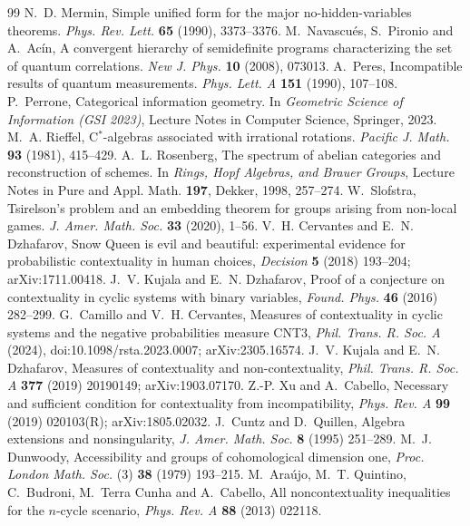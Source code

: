 \documentclass[11pt]{article}
\theoremstyle{definition}\newtheorem{definition}[theorem]{Definition}\newtheorem{remark}[theorem]{Remark}\newtheorem{example}[theorem]{Example}
\begin{document}
\begin{thebibliography}{99}
 N.~D. Mermin, Simple unified form for the major no-hidden-variables theorems. \emph{Phys. Rev. Lett.} \textbf{65} (1990),
  3373--3376.
 M.~Navascu\'es, S.~Pironio and A.~Ac\'in, A convergent hierarchy of semidefinite programs characterizing the set of quantum
  correlations. \emph{New J. Phys.} \textbf{10} (2008), 073013.
 A.~Peres, Incompatible results of quantum measurements. \emph{Phys. Lett. A} \textbf{151} (1990), 107--108.
 P.~Perrone, Categorical information geometry. In \emph{Geometric Science of Information (GSI 2023)}, Lecture Notes in
  Computer Science, Springer, 2023.
 M.~A. Rieffel, C$^*$-algebras associated with irrational rotations. \emph{Pacific J. Math.} \textbf{93} (1981), 415--429.
 A.~L. Rosenberg, The spectrum of abelian categories and reconstruction of schemes. In \emph{Rings, Hopf Algebras, and
  Brauer Groups}, Lecture Notes in Pure and Appl. Math. \textbf{197}, Dekker, 1998, 257--274.
 W.~Slofstra, Tsirelson's problem and an embedding theorem for groups arising from non-local games. \emph{J. Amer. Math.
  Soc.} \textbf{33} (2020), 1--56.
 V.~H. Cervantes and E.~N. Dzhafarov, Snow Queen is evil and beautiful: experimental evidence for probabilistic contextuality in human choices, \emph{Decision} \textbf{5} (2018) 193--204; arXiv:1711.00418.
 J.~V. Kujala and E.~N. Dzhafarov, Proof of a conjecture on contextuality in cyclic systems with binary variables, \emph{Found. Phys.} \textbf{46} (2016) 282--299.
 G.~Camillo and V.~H. Cervantes, Measures of contextuality in cyclic systems and the negative probabilities measure CNT3, \emph{Phil. Trans. R. Soc. A} (2024), doi:10.1098/rsta.2023.0007; arXiv:2305.16574.
 J.~V. Kujala and E.~N. Dzhafarov, Measures of contextuality and non-contextuality, \emph{Phil. Trans. R. Soc. A} \textbf{377} (2019) 20190149; arXiv:1903.07170.
 Z.-P. Xu and A.~Cabello, Necessary and sufficient condition for contextuality from incompatibility, \emph{Phys. Rev. A} \textbf{99} (2019) 020103(R); arXiv:1805.02032.
 J.~Cuntz and D.~Quillen, Algebra extensions and nonsingularity, \emph{J. Amer. Math. Soc.} \textbf{8} (1995) 251--289.
 M.~J. Dunwoody, Accessibility and groups of cohomological dimension one, \emph{Proc. London Math. Soc.} (3) \textbf{38} (1979) 193--215.
 M.~Araújo, M.~T. Quintino, C.~Budroni, M.~Terra Cunha and A.~Cabello, All noncontextuality inequalities for the $n$-cycle scenario, \emph{Phys. Rev. A} \textbf{88} (2013) 022118.

\end{thebibliography}
\end{document}
